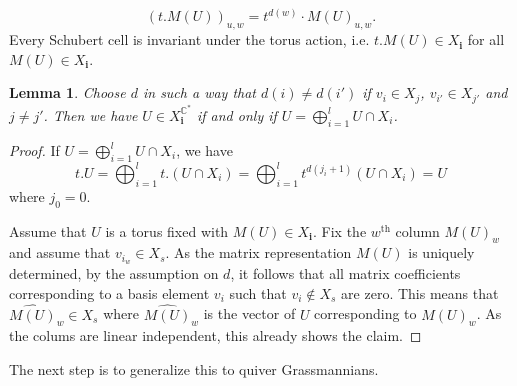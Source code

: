 \documentclass{amsart}
\newtheorem{lemma}[theorem]{Lemma}
\newcommand{\bfi}{\mathbf{i}}
\newcommand{\C}{\mathbb{C}}
\begin{document}
\[(t.M(U))_{u,w}=t^{d(w)}\cdot M(U)_{u,w}.\]
Every Schubert cell is invariant under the torus action, i.e. $t.M(U)\in X_\bfi$ for all $M(U)\in X_{\bfi}$. 
\begin{lemma}\label{usualGrass}
Choose $d$ in such a way that $d(i)\neq d(i')$ if $v_i\in X_j$, $v_{i'}\in X_{j'}$ and $j\neq j'$.
Then we have $U\in X_{\bfi}^{\C^\ast}$ if and only if $U=\bigoplus_{i=1}^l U\cap X_i$.
\end{lemma}
\begin{proof}If $U=\bigoplus_{i=1}^l U\cap X_i$, we have 
\[t.U=\bigoplus_{i=1}^l t.(U\cap X_i)=\bigoplus_{i=1}^l t^{d(j_i+1)}(U\cap X_i)=U\]
where $j_0=0$.

Assume that $U$ is a torus fixed with $M(U)\in X_{\bfi}$. Fix the $w^{\mathrm{th}}$ column $M(U)_w$ and assume that $v_{i_w}\in X_s$. As the matrix representation $M(U)$ is uniquely determined, by the assumption on $d$, it follows that all matrix coefficients corresponding to a basis element $v_i$ such that $v_i\notin X_s$ are zero. This means that $\widehat{M(U)}_w\in X_s$ where $\widehat{M(U)}_w$ is the vector of $U$ corresponding to $M(U)_w$. As the colums are linear independent, this already shows the claim.
\end{proof}
The next step is to generalize this to quiver Grassmannians.
\end{document}
